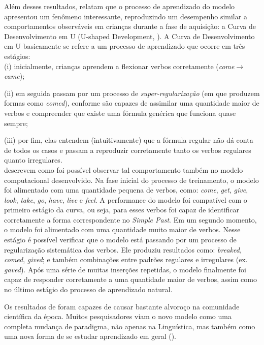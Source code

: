 Além desses resultados, \cite{rumelhart:1986} relatam que o processo de aprendizado do modelo apresentou um fenômeno interessante, reproduzindo um desempenho similar a comportamentos observáveis em crianças durante a fase de aquisição: a Curva de Desenvolvimento em U (U-shaped Development, \cite{marcus:1992}). A Curva de Desenvolvimento em U basicamente se refere a um processo de aprendizado que ocorre em três estágios: \\

(i) inicialmente, crianças aprendem a flexionar verbos corretamente (\textit{come}$\rightarrow$\textit{came});

(ii) em seguida passam por um processo de \textit{super-regularização} (em que produzem formas como \textit{comed}), conforme são capazes de assimilar uma quantidade maior de verbos e compreender que existe uma fórmula genérica que funciona quase sempre;

(iii) por fim, elas entendem (intuitivamente) que a fórmula regular não dá conta de todos os casos e passam a reproduzir corretamente tanto os verbos regulares quanto irregulares. \\


\cite{rumelhart:1986} descrevem como foi possível observar tal comportamento também no modelo computacional desenvolvido.
Na fase inicial do processo de treinamento, o modelo foi alimentado com uma quantidade pequena de verbos, como: \textit{come}, \textit{get}, \textit{give}, \textit{look}, \textit{take}, \textit{go}, \textit{have}, \textit{live} e \textit{feel}. A performance do modelo foi compatível com o primeiro estágio da curva, ou seja, para esses verbos foi capaz de identificar corretamente a forma correspondente no \textit{Simple Past}. Em um segundo momento, o modelo foi alimentado com uma quantidade muito maior de verbos. Nesse estágio é possível verificar que o modelo está passando por um processo de regularização sistemática dos verbos. Ele produziu resultados como: \textit{breaked}, \textit{comed}, \textit{gived}; e também combinações entre padrões regulares e irregulares (ex. \textit{gaved}). 
Após uma série de muitas inserções repetidas, o modelo finalmente foi capaz de responder corretamente a uma quantidade maior de verbos, assim como no último estágio do processo de aprendizado natural. 

Os resultados de \cite{rumelhart:1986} foram capazes de causar bastante alvoroço na comunidade científica da época. Muitos pesquisadores viam o novo modelo como uma completa mudança de paradigma, não apenas na Linguística, mas também como uma nova forma de se estudar aprendizado em geral (\cite{Schneider1987}). 


